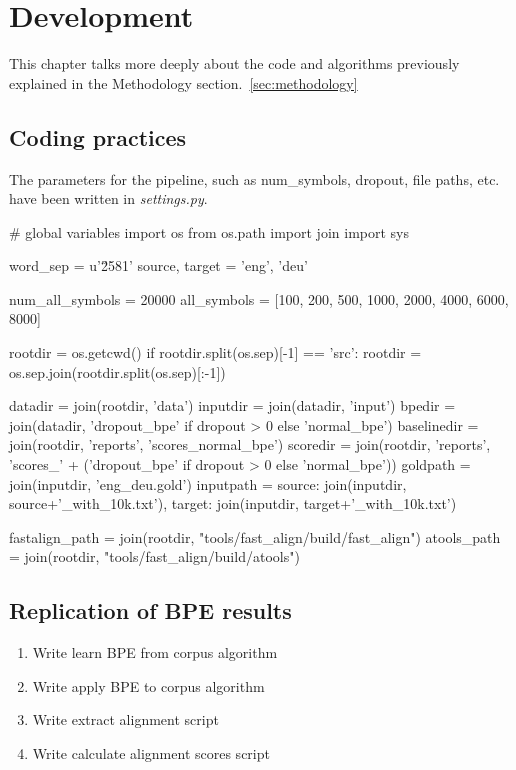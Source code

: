 %
%

\chapter{Development}\label{sec:development}

This chapter talks more deeply about the code and algorithms previously explained in the Methodology section.~\ref{sec:methodology}

\section{Coding practices}

The parameters for the pipeline, such as num\_symbols, dropout, file paths, etc. have been written in \emph{settings.py}.

\begin{python}
# global variables
import os
from os.path import join
import sys

word_sep = u'\u2581'
source, target = 'eng', 'deu'

num_all_symbols = 20000
all_symbols = [100, 200, 500, 1000, 2000, 4000, 6000, 8000]

rootdir = os.getcwd()
if rootdir.split(os.sep)[-1] == 'src':
    rootdir = os.sep.join(rootdir.split(os.sep)[:-1])

datadir = join(rootdir, 'data')
inputdir = join(datadir, 'input')
bpedir = join(datadir, 'dropout_bpe' if dropout > 0 else 'normal_bpe')
baselinedir = join(rootdir, 'reports', 'scores_normal_bpe')
scoredir = join(rootdir, 'reports', 'scores_' + ('dropout_bpe' if dropout > 0 else 'normal_bpe'))
goldpath = join(inputdir, 'eng_deu.gold')
inputpath = {source: join(inputdir, source+'_with_10k.txt'),
            target: join(inputdir, target+'_with_10k.txt')}

fastalign_path = join(rootdir, "tools/fast_align/build/fast_align")
atools_path = join(rootdir, "tools/fast_align/build/atools")
    
\end{python}

\section{Replication of BPE results}

\begin{enumerate}
    \item Write learn BPE from corpus algorithm
    \item Write apply BPE to corpus algorithm
    \item Write extract alignment script
    \item Write calculate alignment scores script
\end{enumerate}

